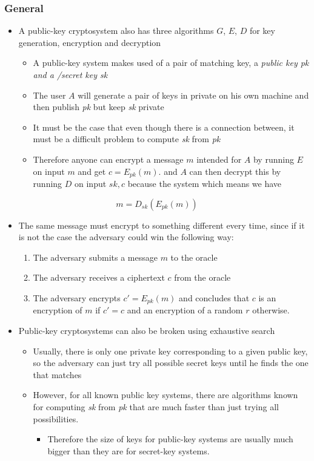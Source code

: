 \documentclass[11pt]{article}
\begin{document}
\subsubsection{General}
\label{sec:org8442c6e}
\begin{itemize}
\item A public-key cryptosystem also has three algorithms \(G\), \(E\), \(D\) for key generation, encryption and decryption
\begin{itemize}
\item A public-key system makes used of a pair of matching key, a \emph{public key pk and a /secret key sk}
\item The user \(A\) will generate a pair of keys in private on his own machine and then publish \emph{pk} but keep \emph{sk} private
\item It must be the case that even though there is a connection between, it must be a difficult problem to compute \emph{sk} from \emph{pk}
\item Therefore anyone can encrypt a message \(m\) intended for \(A\) by running \(E\) on input \(m\) and get \(c=E_{pk}(m)\). and \(A\) can then decrypt this by running \(D\) on input \(sk,c\) because the system which means we have
\end{itemize}
\end{itemize}
\begin{equation}
  m=D_{sk}(E_{pk}(m)) 
\end{equation}

\begin{itemize}
\item The same message must encrypt to something different every time, since if it is not the case the adversary could win the following way:
\begin{enumerate}
\item The adversary submits a message \(m\) to the oracle
\item The adversary receives a ciphertext \(c\) from the oracle
\item The adversary encrypts \(c'=E_{pk}(m)\) and concludes that \(c\) is an encryption of \(m\) if \(c'=c\) and an encryption of a random \(r\) otherwise.
\end{enumerate}

\item Public-key cryptosystems can also be broken using exhaustive search
\begin{itemize}
\item Usually, there is only one private key corresponding to a given public key, so the adversary can just try all possible secret keys until he finds the one that matches
\item However, for all known public key systems, there are algorithms known for computing \emph{sk} from \emph{pk} that are much faster than just trying all possibilities.
\begin{itemize}
\item Therefore the size of keys for public-key systems are usually much bigger than they are for secret-key systems.
\end{itemize}
\end{itemize}
\end{itemize}
\end{document}
